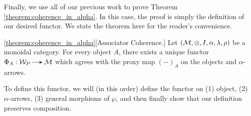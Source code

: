 Finally, we use all of our previous work to prove Theorem \ref{theorem:coherence_in_alpha}.
In this case, the proof is simply the definition of our desired functor.
We state the theorem here for the reader's convenience.

\begin{customthm}{\ref{theorem:coherence_in_alpha}}[Associator Coherence.]
    Let $(\mathcal{M}, \otimes, I, \alpha, \lambda, \rho)$ be a monoidal category. 
    For every object $A$, there exists a unique functor 
    $\Phi_A: \ww_P \to \mm$ which agrees with the proxy map $(-)_A$ on the objects and $\alpha$-arrows.
\end{customthm}

To define this functor, we will (in this order) define the functor on 
(1) object, (2) $\alpha$-arrows, (3) general morphisms of $\wp$, and then 
finally show that our definition preserves composition.


